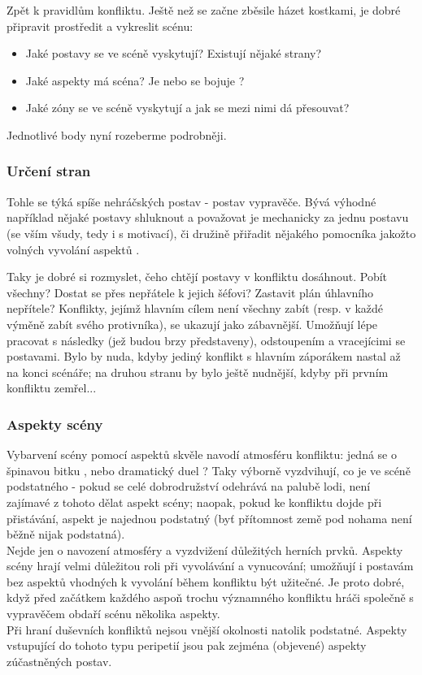 Zpět k pravidlům konfliktu. Ještě než se začne zběsile házet kostkami, je dobré připravit prostředit a vykreslit scénu:

\begin{itemize}
\item Jaké postavy se ve scéně vyskytují? Existují nějaké strany?
\item Jaké aspekty má scéna? Je  nebo se bojuje ?
\item Jaké zóny se ve scéně vyskytují a jak se mezi nimi dá přesouvat?
\end{itemize}

Jednotlivé body nyní rozeberme podrobněji.

\subsubsection{Určení stran}
\label{sec:urcenistran}
Tohle se týká spíše nehráčských postav - postav vypravěče. Bývá výhodné například nějaké postavy shluknout a považovat je mechanicky za jednu postavu (se vším všudy, tedy i s motivací), či družině přiřadit nějakého pomocníka jakožto volných vyvolání aspektů .

Taky je dobré si rozmyslet, čeho chtějí postavy v konfliktu dosáhnout. Pobít všechny? Dostat se přes nepřátele k jejich šéfovi? Zastavit plán úhlavního nepřítele? Konflikty, jejímž hlavním cílem není všechny zabít (resp. v každé výměně zabít svého protivníka), se ukazují jako zábavnější. Umožňují lépe pracovat s následky (jež budou brzy představeny), odstoupením a vracejícimi se postavami. Bylo by nuda, kdyby jediný konflikt s hlavním záporákem nastal až na konci scénáře; na druhou stranu by bylo ještě nudnější, kdyby při prvním konfliktu zemřel...

\subsubsection{Aspekty scény}
\label{sec:aspektysceny}

Vybarvení scény pomocí aspektů skvěle navodí atmosféru konfliktu: jedná se o špinavou bitku , nebo dramatický duel ? Taky výborně vyzdvihují, co je ve scéně podstatného - pokud se celé dobrodružství odehrává na palubě lodi, není zajímavé z tohoto dělat aspekt scény; naopak, pokud ke konfliktu dojde při přistávání, aspekt  je najednou podstatný (byť přítomnost země pod nohama není běžně nijak podstatná).\\
Nejde jen o navození atmosféry a vyzdvižení důležitých herních prvků. Aspekty scény hrají velmi důležitou roli při vyvolávání a vynucování; umožňují i postavám bez aspektů vhodných k vyvolání během konfliktu být užitečné. Je proto dobré, když před začátkem každého aspoň trochu významného konfliktu hráči společně s vypravěčem obdaří scénu několika aspekty.\\
Při hraní duševních konfliktů nejsou vnější okolnosti natolik podstatné. Aspekty vstupující do tohoto typu peripetií jsou pak zejména (objevené) aspekty zúčastněných postav.

